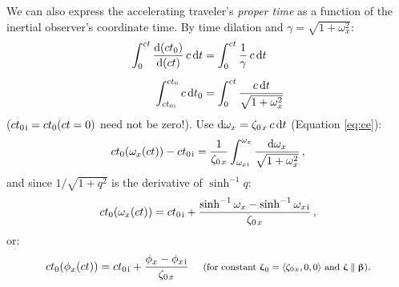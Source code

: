 \documentclass[12pt]{article}
\newcommand{\dd}[1]{\mathrm{d}#1}
\newcommand{\vvbeta}{\bm{\upbeta}}
\newcommand{\vvzeta}{\bm{\upzeta}}
\begin{document}
We can also express the accelerating traveler's \emph{proper time} as a function of the inertial observer's coordinate time. By time dilation and $\gamma = \sqrt{1 + \omega^2_x}$:
\begin{equation*}
\begin{aligned}
\int^{ct}_0 \dfrac{\dd (c t_0)}{\dd (ct)}  \, c \, \dd t &= \int^{ct}_0 \dfrac{1}{\gamma} \, c \, \dd t \\[5pt]
\int^{ct_0}_{ct_{0 \mkern1mu \mathrm{i}}} c \, \dd t_0 &= \int^{ct}_0 \dfrac{c \, \dd t}{\sqrt{1 + \omega^2_x}}
\end{aligned}
\end{equation*}
($ct_{0 \mkern2mu \mathrm{i}} = ct_0 (ct = 0)$ need not be zero!). Use $\dd \omega_x = \zeta_{0 \mkern2mu x} \, c \, \dd t$ (Equation \ref{eq:ce}):
\begin{equation*}
ct_0 (\omega_x(ct)) - ct_{0 \mkern2mu \mathrm{i}} = \dfrac{1}{\zeta_{0 \mkern2mu x}} \int^{\omega_x}_{\omega_{x \mkern1mu \textrm{i} }} \dfrac{\dd \omega_x}{\sqrt{1 + \omega^2_x}} \, ,
\end{equation*}
and since $1/\sqrt{1 + q^2}$ is the derivative of $\sinh^{-1} q$:
\begin{equation*}
ct_0 (\omega_x(ct)) = ct_{0 \mkern2mu \mathrm{i}} + \dfrac{\sinh^{-1} \omega_x - \sinh^{-1} \omega_{x \mkern2mu \textrm{i} }}{ \zeta_{0 \mkern2mu x}} \, ,
\end{equation*}
or:
\begin{equation}\label{eq:pt}
ct_0 (\phi_x(ct)) = ct_{0 \mkern2mu \mathrm{i}} + \dfrac{ \phi_x - \phi_{x \mkern2mu \mathrm{i} }}{ \zeta_{0 \mkern2mu x}}  \quad \textrm{\footnotesize{ (for constant $\vvzeta_{\mkern1mu 0} = \langle \zeta_{0 \mkern1mu x} , 0, 0 \rangle$ and $\vvzeta \parallel \vvbeta$)}}.
\end{equation}
\end{document}
